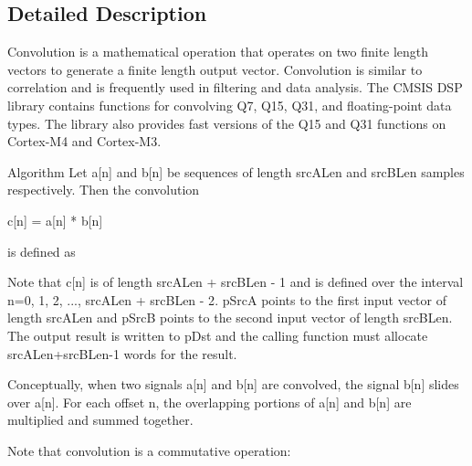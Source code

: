 \subsection{Detailed Description}
Convolution is a mathematical operation that operates on two finite length vectors to generate a finite length output vector. Convolution is similar to correlation and is frequently used in filtering and data analysis. The C\-M\-S\-I\-S D\-S\-P library contains functions for convolving Q7, Q15, Q31, and floating-\/point data types. The library also provides fast versions of the Q15 and Q31 functions on Cortex-\/\-M4 and Cortex-\/\-M3.

\begin{DoxyParagraph}{Algorithm }
Let {\ttfamily a\mbox{[}n\mbox{]}} and {\ttfamily b\mbox{[}n\mbox{]}} be sequences of length {\ttfamily src\-A\-Len} and {\ttfamily src\-B\-Len} samples respectively. Then the convolution
\end{DoxyParagraph}

\begin{DoxyPre}    
                  c[n] = a[n] * b[n]    
\end{DoxyPre}


\begin{DoxyParagraph}{}
is defined as  
\end{DoxyParagraph}
\begin{DoxyParagraph}{}
Note that {\ttfamily c\mbox{[}n\mbox{]}} is of length {\ttfamily src\-A\-Len + src\-B\-Len -\/ 1} and is defined over the interval {\ttfamily n=0, 1, 2, ..., src\-A\-Len + src\-B\-Len -\/ 2}. {\ttfamily p\-Src\-A} points to the first input vector of length {\ttfamily src\-A\-Len} and {\ttfamily p\-Src\-B} points to the second input vector of length {\ttfamily src\-B\-Len}. The output result is written to {\ttfamily p\-Dst} and the calling function must allocate {\ttfamily src\-A\-Len+src\-B\-Len-\/1} words for the result.
\end{DoxyParagraph}
\begin{DoxyParagraph}{}
Conceptually, when two signals {\ttfamily a\mbox{[}n\mbox{]}} and {\ttfamily b\mbox{[}n\mbox{]}} are convolved, the signal {\ttfamily b\mbox{[}n\mbox{]}} slides over {\ttfamily a\mbox{[}n\mbox{]}}. For each offset {\ttfamily n}, the overlapping portions of a\mbox{[}n\mbox{]} and b\mbox{[}n\mbox{]} are multiplied and summed together.
\end{DoxyParagraph}
\begin{DoxyParagraph}{}
Note that convolution is a commutative operation\-:
\end{DoxyParagraph}

